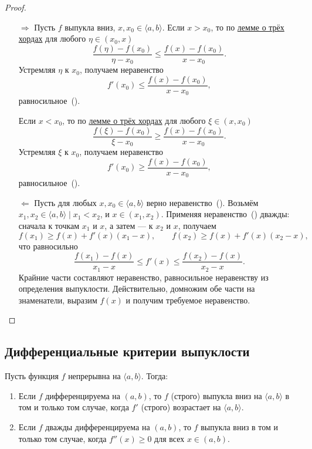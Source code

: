 \begin{proof}
	\begin{enumerate}
		\item[\(\Rightarrow\)] Пусть \(f\) выпукла вниз, \(x, x_0 \in \langle a, b \rangle\). Если \(x > x_0\), то по \hyperlink{trihordy}{лемме о трёх хордах} для любого \(\eta \in (x_0, x)\) \[
		\frac{f(\eta) - f(x_0)}{\eta - x_0} \leqslant \frac{f(x) - f(x_0)}{x - x_0}.
		\]
		Устремляя \(\eta\) к \(x_0\), получаем неравенство \[
		f'(x_0) \leqslant \frac{f(x) - f(x_0)}{x - x_0},
		\]
		равносильное~(\textasteriskcentered).
		
		Если \(x < x_0\), то по \hyperlink{trihordy}{лемме о трёх хордах} для любого \(\xi \in (x, x_0)\) \[
		\frac{f(\xi) - f(x_0)}{\xi - x_0} \geqslant \frac{f(x) - f(x_0)}{x - x_0}.
		\]
		Устремляя \(\xi\) к \(x_0\), получаем неравенство \[
		f'(x_0) \geqslant \frac{f(x) - f(x_0)}{x - x_0},
		\]
		равносильное~(\textasteriskcentered).
		\item[\(\Leftarrow\)] Пусть для любых \(x, x_0 \in \langle a, b \rangle\) верно неравенство~(\textasteriskcentered). Возьмём \(x_1, x_2 \in \langle a, b \rangle \mid x_1 < x_2\), и \(x \in (x_1, x_2)\). Применяя неравенство~(\textasteriskcentered) дважды: сначала к точкам \(x_1\) и \(x\), а затем --- к \(x_2\) и \(x\), получаем \[
		f(x_1) \geqslant f(x) + f'(x) (x_1 - x), \qquad f(x_2) \geqslant f(x) + f'(x) (x_2 - x),
		\]
		что равносильно \[
		\frac{f(x_1) - f(x)}{x_1 - x} \leqslant f'(x) \leqslant \frac{f(x_2) - f(x)}{x_2 - x}.
		\]
		Крайние части составляют неравенство, равносильное неравенству из определения выпуклости. Действительно, домножим обе части на знаменатели, выразим \(f(x)\) и получим требуемое неравенство.
	\end{enumerate}
\end{proof}

\subsection{Дифференциальные критерии выпуклости}

\begin{theorem}
	Пусть функция \(f\) непрерывна на \(\langle a, b \rangle\). Тогда:
	\begin{enumerate}
		\item Если \(f\) дифференцируема на \((a, b)\), то \(f\) (строго) выпукла вниз на \(\langle a, b \rangle\) в том и только том случае, когда \(f'\) (строго) возрастает на \(\langle a, b \rangle\).
		\item Если \(f\) дважды дифференцируема на \((a, b)\), то \(f\) выпукла вниз в том и только том случае, когда \(f''(x) \geqslant 0\) для всех \(x \in (a, b)\).
	\end{enumerate}
\end{theorem}

